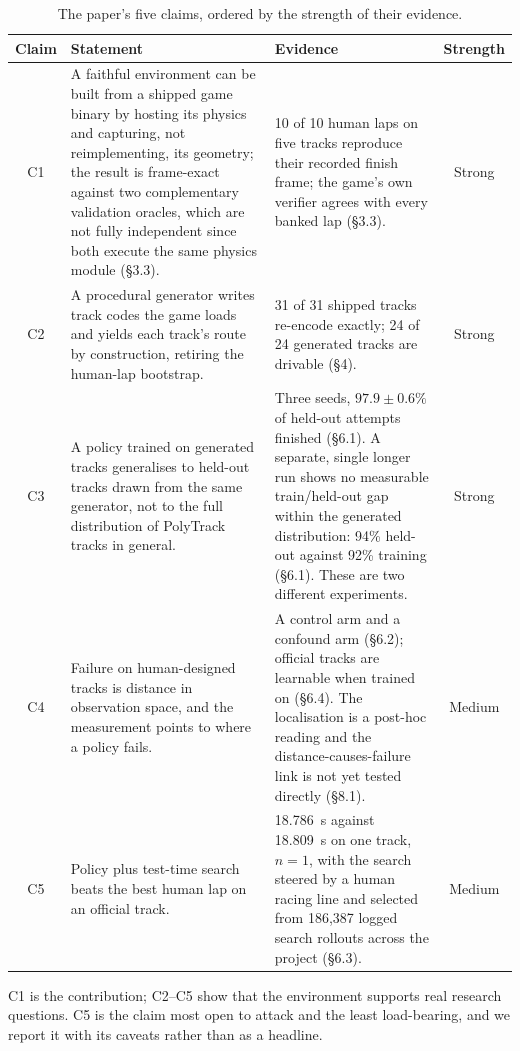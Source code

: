 \documentclass[11pt]{article}
\begin{document}
\begin{table}[h]
\centering
\small
\begin{tabular}{@{}cL{5.2cm}L{5.2cm}c@{}}
\toprule
\textbf{Claim} & \textbf{Statement} & \textbf{Evidence} & \textbf{Strength} \\
\midrule
C1 & A faithful environment can be built from a shipped game binary by hosting its physics and capturing, not reimplementing, its geometry; the result is frame-exact against two complementary validation oracles, which are not fully independent since both execute the same physics module (\S3.3). & 10 of 10 human laps on five tracks reproduce their recorded finish frame; the game's own verifier agrees with every banked lap (\S3.3). & Strong \\
\addlinespace
C2 & A procedural generator writes track codes the game loads and yields each track's route by construction, retiring the human-lap bootstrap. & 31 of 31 shipped tracks re-encode exactly; 24 of 24 generated tracks are drivable (\S4). & Strong \\
\addlinespace
C3 & A policy trained on generated tracks generalises to held-out tracks drawn from the same generator, not to the full distribution of PolyTrack tracks in general. & Three seeds, $97.9 \pm 0.6\%$ of held-out attempts finished (\S6.1). A separate, single longer run shows no measurable train/held-out gap within the generated distribution: 94\% held-out against 92\% training (\S6.1). These are two different experiments. & Strong \\
\addlinespace
C4 & Failure on human-designed tracks is distance in observation space, and the measurement points to where a policy fails. & A control arm and a confound arm (\S6.2); official tracks are learnable when trained on (\S6.4). The localisation is a post-hoc reading and the distance-causes-failure link is not yet tested directly (\S8.1). & Medium \\
\addlinespace
C5 & Policy plus test-time search beats the best human lap on an official track. & 18.786~s against 18.809~s on one track, $n=1$, with the search steered by a human racing line and selected from 186,387 logged search rollouts across the project (\S6.3). & Medium \\
\bottomrule
\end{tabular}
\caption{The paper's five claims, ordered by the strength of their evidence.}
\label{tab:claims}
\end{table}

C1 is the contribution; C2--C5 show that the environment supports real research questions. C5 is the claim most open to attack and the least load-bearing, and we report it with its caveats rather than as a headline.
\end{document}
